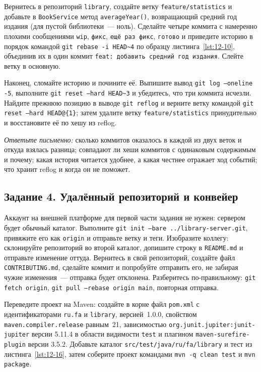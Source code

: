 Вернитесь в репозиторий \texttt{library}, создайте ветку \texttt{feature/statistics} и добавьте в \texttt{BookService} метод \texttt{averageYear()}, возвращающий средний год издания (для пустой библиотеки~--- ноль). Сделайте четыре коммита с намеренно плохими сообщениями \texttt{wip}, \texttt{фикс}, \texttt{ещё раз фикс}, \texttt{готово} и приведите историю в порядок командой \texttt{git rebase -i HEAD\textasciitilde 4} по образцу листинга~\ref{lst:12-10}, объединив их в один коммит \texttt{feat: добавить средний год издания}. Слейте ветку в основную.

Наконец, сломайте историю и почините её. Выпишите вывод \texttt{git log --oneline -5}, выполните \texttt{git reset --hard HEAD\textasciitilde 3} и убедитесь, что три коммита исчезли. Найдите прежнюю позицию в выводе \texttt{git reflog} и верните ветку командой \texttt{git reset --hard HEAD@\{1\}}; затем удалите ветку \texttt{feature/statistics} принудительно и восстановите её по хешу из reflog.

\emph{Ответьте письменно:} сколько коммитов оказалось в каждой из двух веток и откуда взялась разница; совпадают ли хеши коммитов с одинаковым содержимым и почему; какая история читается удобнее, а какая честнее отражает ход событий; что хранит reflog и когда он не поможет.

\subsection*{Задание 4. Удалённый репозиторий и конвейер}

Аккаунт на внешней платформе для первой части задания не нужен: сервером будет обычный каталог. Выполните \texttt{git init --bare ../library-server.git}, привяжите его как \texttt{origin} и отправьте ветку и теги. Изобразите коллегу: склонируйте репозиторий во второй каталог, допишите строку в \texttt{README.md} и отправьте изменение оттуда. Вернитесь в свой репозиторий, создайте файл \texttt{CONTRIBUTING.md}, сделайте коммит и попробуйте отправить его, не забирая чужие изменения~--- отправка будет отклонена. Разберитесь по-правильному: \texttt{git fetch origin}, \texttt{git pull --rebase origin main}, повторная отправка.

Переведите проект на Maven: создайте в корне файл \texttt{pom.xml} с идентификаторами \texttt{ru.fa} и \texttt{library}, версией~1.0.0, свойством \texttt{maven.compiler.release} равным~21, зависимостью \texttt{org.junit.jupiter:junit-jupiter} версии 5.11.4 в области видимости \texttt{test} и плагином \texttt{maven-surefire-plugin} версии 3.5.2. Добавьте каталог \texttt{src/test/java/ru/fa/library} и тест из листинга~\ref{lst:12-16}, затем соберите проект командами \texttt{mvn -q clean test} и \texttt{mvn package}.

